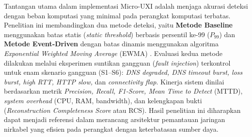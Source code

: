 Tantangan utama dalam implementasi Micro-UXI adalah menjaga akurasi deteksi dengan beban komputasi yang minimal pada perangkat komputasi terbatas. Penelitian ini membandingkan dua metode deteksi, yaitu \textbf{Metode Baseline} menggunakan batas statis (\textit{static threshold}) berbasis persentil ke-99 ($P_{99}$) dan \textbf{Metode Event-Driven} dengan batas dinamis menggunakan algoritma \textit{Exponential Weighted Moving Average} (EWMA) \cite{miranda2022}. Evaluasi kedua metode dilakukan melalui eksperimen suntikan gangguan (\textit{fault injection}) terkontrol \cite{cotroneo2022} untuk enam skenario gangguan (S1--S6): \textit{DNS degraded, DNS timeout burst, loss burst, high RTT, HTTP slow,} dan \textit{connectivity flap}. Kinerja sistem dinilai berdasarkan metrik \textit{Precision, Recall, F1-Score, Mean Time to Detect} (MTTD), \textit{system overhead} (CPU, RAM, bandwidth), dan kelengkapan bukti (\textit{Reconstruction Completeness Score} atau RCS). Hasil penelitian ini diharapkan dapat menjadi referensi dalam merancang arsitektur pemantauan jaringan nirkabel yang efisien pada perangkat dengan keterbatasan sumber daya.